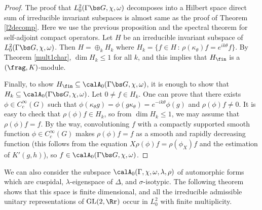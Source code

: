 \documentclass{article}
\newcommand{\GL}{\mathrm{GL}}
\begin{document}
\begin{proof}
The proof that $L_{0}^{2}(\Gamma \bs G, \chi, \omega)$ decomposes into a Hilbert space direct sum of irreducible invariant subspaces is almost same as the proof of Theorem \ref{l2decomp}. Here we use the previous proposition and the spectral theorem for self-adjoint compact operators. 
Let $H$ be an irreducible invariant subspace of $L_{0}^{2}(\Gamma \bs G, \chi, \omega)$. 
Then $H = \oplus_{k} H_{k}$ where $H_{k} = \{f\in H\,:\, \rho(\kappa_{\theta})f = e^{ik\theta}f\}$. 
By Theorem \ref{mult1char}, $\dim H_{k} \leq 1$ for all $k$, and this implies that $H_{\fin}$ is a $(\frag, K)$-module. 

Finally, to show $H_{\fin} \subseteq \calA_{0}(\Gamma\bs G, \chi, \omega)$, it is enough to show that $H_{k} \subseteq \calA_{0}(\Gamma\bs G, \chi, \omega)$. 
Let $0\neq f\in H_k$. 
One can prove that there exists $\phi\in C_{c}^{\infty}(G)$ such that $\phi(\kappa_{\theta}g) = \phi(g\kappa_{\theta}) = e^{-ik\theta}\phi(g)$ and $\rho(\phi)f \neq 0$. 
It is easy to check that $\rho(\phi)f\in H_k$, so from $\dim H_k \leq 1$, we may assume that $\rho(\phi) f = f$. 
By the way, convolutioning $f$ with a compactly supported smooth function $\phi\in C_{c}^{\infty}(G)$ makes $\rho(\phi)f = f$ as a smooth and rapidly decreasing function (this follows from the equation $X\rho(\phi)f = \rho(\phi_X)f$ and the estimation of $K'(g, h)$), so $f\in \calA_{0}(\Gamma \bs G, \chi, \omega)$. 
\end{proof}


We can also consider the subspace $\calA_{0}(\Gamma, \chi, \omega, \lambda, \rho)$ of automorphic forms which are cuspidal, $\lambda$-eigenspace of $\Delta$, and $\sigma$-isotypic. 
The following theorem shows that this space is finite dimensional, and all the irreducible admissible unitary representations of $\GL(2, \Rr)$ occur in $L^{2}_{0}$ with finite multiplicity. 
\end{document}
